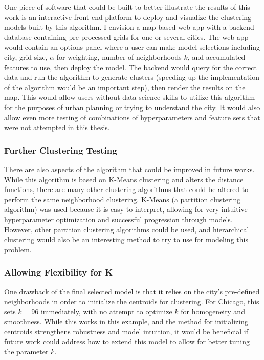 \documentclass[times new roman,12pt]{article}
\begin{document}
One piece of software that could be built to better illustrate the results of this work is an interactive front end platform to deploy and visualize the clustering models built by this algorithm. I envision a map-based web app with a backend database containing pre-processed grids for one or several cities. The web app would contain an options panel where a user can make model selections including city, grid size, $\alpha$ for weighting, number of neighborhoods $k$, and accumulated features to use, then deploy the model. The backend would query for the correct data and run the algorithm to generate clusters (speeding up the implementation of the algorithm would be an important step), then render the results on the map. This would allow users without data science skills to utilize this algorithm for the purposes of urban planning or trying to understand the city. It would also allow even more testing of combinations of hyperparameters and feature sets that were not attempted in this thesis. 

\subsubsection{Further Clustering Testing}

There are also aspects of the algorithm that could be improved in future works. While this algorithm is based on K-Means clustering and alters the distance functions, there are many other clustering algorithms that could be altered to perform the same neighborhood clustering. K-Means (a partition clustering algorithm) was used because it is easy to interpret, allowing for very intuitive hyperparameter optimization and successful progression through models. However, other partition clustering algorithms could be used, and hierarchical clustering would also be an interesting method to try to use for modeling this problem. 

\subsubsection{Allowing Flexibility for K}

One drawback of the final selected model is that it relies on the city's pre-defined neighborhoods in order to initialize the centroids for clustering. For Chicago, this sets $k=96$ immediately, with no attempt to optimize $k$ for homogeneity and smoothness. While this works in this example, and the method for initializing centroids strengthens robustness and model intuition, it would be beneficial if future work could address how to extend this model to allow for better tuning the parameter $k$. 
\end{document}
